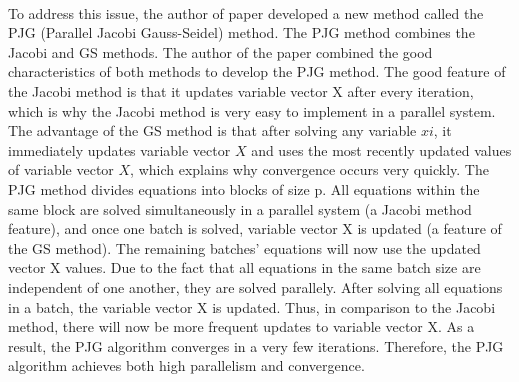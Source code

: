 \documentclass[11pt]{article}       %
\begin{document}
\noindent \\ To address this issue, the author of paper \cite{base-paper} developed a new method called the PJG (Parallel Jacobi Gauss-Seidel) method. The PJG method combines the Jacobi and GS methods. The author of the paper \cite{base-paper} combined the good characteristics of both methods to develop the PJG method. The good feature of the Jacobi method is that it updates variable vector X after every iteration, which is why the Jacobi method is very easy to implement in a parallel system. The advantage of the GS method is that after solving any variable $x i$, it immediately updates variable vector $X$ and uses the most recently updated values of variable vector $X$, which explains why convergence occurs very quickly. The PJG method divides equations into blocks of size p. All equations within the same block are solved simultaneously in a parallel system (a Jacobi method feature), and once one batch is solved, variable vector X is updated (a feature of the GS method). The remaining batches' equations will now use the updated vector X values. Due to the fact that all equations in the same batch size are independent of one another, they are solved parallely. After solving all equations in a batch, the variable vector X is updated. Thus, in comparison to the Jacobi method, there will now be more frequent updates to variable vector X. As a result, the PJG algorithm converges in a very few iterations. Therefore, the PJG algorithm achieves both high parallelism and convergence.
\end{document}
